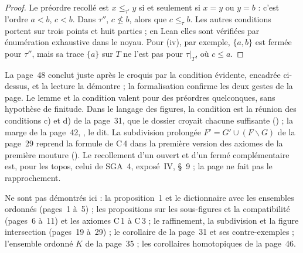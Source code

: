 \begin{proof}
Le préordre recollé est $x \leq_{\tau'} y$ si et seulement si $x = y$ ou $y = b$ : c'est l'ordre $a < b$, $c < b$. Dans $\tau''$, $c \not\leq b$, alors que $c \leq_\tau b$. Les autres conditions portent sur trois points et huit parties ; en Lean elles sont vérifiées par énumération exhaustive dans le noyau. Pour (iv), par exemple, $\{a, b\}$ est fermée pour $\tau''$, mais sa trace $\{a\}$ sur $T$ ne l'est pas pour $\tau|_T$, où $c \leq a$.
\end{proof}

\begin{remarque}
La page~48 conclut juste après le croquis par la condition évidente, encadrée ci-dessus, et la lecture la démontre ; la formalisation confirme les deux gestes de la page. Le lemme et la condition valent pour des préordres quelconques, sans hypothèse de finitude. Dans le langage des figures, la condition est la réunion des conditions c) et d) de la page~31, que le dossier croyait chacune suffisante () ; la marge de la page~42, , le dit. La subdivision prolongée $F' = G' \cup (F \smallsetminus G)$ de la page~29 reprend la formule de C\,4 dans la première version des axiomes de la première mouture (). Le recollement d'un ouvert et d'un fermé complémentaire est, pour les topos, celui de SGA~4, exposé~IV, §~9 \cite{sga4-1} ; la page ne fait pas le rapprochement.
\end{remarque}

Ne sont pas démontrés ici : la proposition~1 et le dictionnaire avec les ensembles ordonnés (pages~1 à~5) ; les propositions sur les sous-figures et la compatibilité (pages~6 à~11) et les axiomes C\,1 à C\,3 ; le raffinement, la subdivision et la figure intersection (pages~19 à~29) ; le corollaire de la page~31 et ses contre-exemples ; l'ensemble ordonné $K$ de la page~35 ; les corollaires homotopiques de la page~46.
